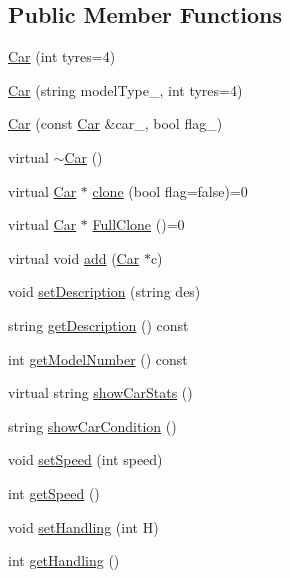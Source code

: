 \subsection*{Public Member Functions}
\begin{DoxyCompactItemize}
\item 
\mbox{\hyperlink{class_car_ab740ed295feccd6ba2ffcc954623fc36}{Car}} (int tyres=4)
\item 
\mbox{\hyperlink{class_car_ab471ee86f9ba3bc2637b526233932513}{Car}} (string model\+Type\+\_\+, int tyres=4)
\item 
\mbox{\hyperlink{class_car_a934bad1647e59360395ac3cbd71c6a8d}{Car}} (const \mbox{\hyperlink{class_car}{Car}} \&car\+\_\+, bool flag\+\_\+)
\item 
virtual \mbox{\hyperlink{class_car_a7f5f88d8a933b9de494e6beb818003f1}{$\sim$\+Car}} ()
\item 
virtual \mbox{\hyperlink{class_car}{Car}} $\ast$ \mbox{\hyperlink{class_car_a27ad98735fd4a3f675234ea806c227da}{clone}} (bool flag=false)=0
\item 
virtual \mbox{\hyperlink{class_car}{Car}} $\ast$ \mbox{\hyperlink{class_car_a6e32b3e8ddaaf2b3873c849e42f6a085}{Full\+Clone}} ()=0
\item 
virtual void \mbox{\hyperlink{class_car_aca44e1a112ae22217c8004e92a86c374}{add}} (\mbox{\hyperlink{class_car}{Car}} $\ast$c)
\item 
void \mbox{\hyperlink{class_car_a0dcda3633cafc81e96dffcbdc5bdeeb0}{set\+Description}} (string des)
\item 
string \mbox{\hyperlink{class_car_aa9255a0bd2fdb42948fea897b13d574f}{get\+Description}} () const
\item 
int \mbox{\hyperlink{class_car_aea72486ce71ff0989725e8abda128e00}{get\+Model\+Number}} () const
\item 
virtual string \mbox{\hyperlink{class_car_a19567ab900b1c676f0244b15ec14dbad}{show\+Car\+Stats}} ()
\item 
string \mbox{\hyperlink{class_car_af26b903e790eb44d638ba57e78e27e1b}{show\+Car\+Condition}} ()
\item 
void \mbox{\hyperlink{class_car_acf64780a1426bea0549759c1a0b83838}{set\+Speed}} (int speed)
\item 
int \mbox{\hyperlink{class_car_a18e48b5cf9815216b8e82351d36b8d9f}{get\+Speed}} ()
\item 
void \mbox{\hyperlink{class_car_aa5ef6b0602af458c67c0c9845ee82899}{set\+Handling}} (int H)
\item 
int \mbox{\hyperlink{class_car_a1ebc0aefed91d874aed3f93789c51209}{get\+Handling}} ()

\end{DoxyCompactItemize}
